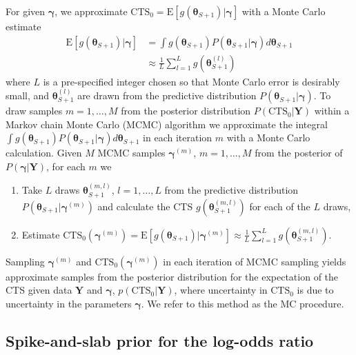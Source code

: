 \documentclass[AMA,STIX1COL]{WileyNJD-v2}
\newcommand{\E}{\mbox{E}}
\newcommand{\boldtheta}{\boldsymbol{\theta}}
\newcommand{\boldgamma}{\boldsymbol{\gamma}}
\newcommand{\CTSo}{\text{CTS}_0}
\begin{document}
For given $\boldgamma$, we approximate $\CTSo = \E[g(\boldtheta_{S + 1}) \vert \boldgamma]$ with a Monte Carlo estimate 
\begin{equation}
\begin{split}
\E[g(\boldtheta_{S + 1}) \vert \boldgamma] & = \boldsymbol{\int}g(\boldtheta_{S + 1})  P(\boldtheta_{S + 1} \vert \boldgamma)  d\boldtheta_{S + 1} \\
 &\approx \frac{1}{L} \sum_{l=1}^L g(\boldtheta_{S + 1}^{(l)})
\end{split}
\end{equation}
\noindent where $L$ is a pre-specified integer chosen so that Monte Carlo error is desirably small, and $\boldtheta_{S + 1}^{(l)}$ are drawn from the predictive distribution $P(\boldtheta_{S + 1} \vert \boldgamma)$. To draw samples $m = 1, \dots, M$ from the posterior distribution $P(\CTSo \vert \boldsymbol{Y})$ within a Markov chain Monte Carlo (MCMC) algorithm we approximate the integral $\boldsymbol{\int}g(\boldtheta_{S + 1})  P(\boldtheta_{S + 1} \vert \boldgamma) d\boldtheta_{S + 1}$ in each iteration $m$ with a Monte Carlo calculation. Given $M$ MCMC samples $\boldgamma^{(m)}$, $m = 1, \dots, M$ from the posterior of $P(\boldgamma \vert \boldsymbol{Y})$, for each $m$ we
\begin{enumerate} \label{proc:nestedMC}
\item Take $L$ draws $\boldtheta_{S + 1}^{(m, l)}$, $l = 1, \dots, L$ from the predictive distribution $P(\boldtheta_{S + 1}\vert \boldgamma^{(m)})$ and calculate the CTS $g(\boldtheta_{S + 1}^{(m, l)})$ for each of the $L$ draws, 
\item Estimate $\CTSo(\boldgamma^{(m)}) = \E[g(\boldtheta_{S + 1})\vert \boldgamma^{(m)}] \approx \frac{1}{L} \sum_{l=1}^L g(\boldtheta_{S + 1}^{(m, l)})$.
\end{enumerate}
Sampling $\boldgamma^{(m)}$ and $\CTSo(\boldgamma^{(m)})$ in each iteration of MCMC sampling yields approximate samples from the posterior distribution for the expectation of the CTS given data $\boldsymbol{Y}$ and $\boldgamma$, $p(\CTSo \vert \boldsymbol{Y})$, where uncertainty in $\CTSo$ is due to uncertainty in the parameters $\boldgamma$. We refer to this method as the MC procedure.

\subsection{Spike-and-slab prior for the log-odds ratio} \label{sec:spike}
\end{document}
